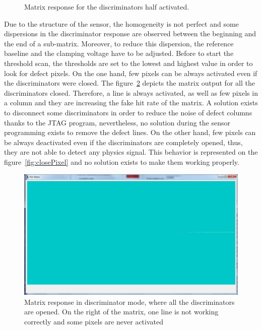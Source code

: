   \begin{figure}[!h]
    \caption{Matrix response for the discriminators half activated.}
    \label{fig:homogeneityMi26}
  \end{figure}
  
  Due to the structure of the sensor, the homogeneity is not perfect and some dispersions in the discriminator response are observed between the beginning and the end of a sub-matrix.
  Moreover, to reduce this dispersion, the reference baseline and the clamping voltage have to be adjusted.
  Before to start the threshold scan, the thresholds are set to the lowest and highest value in order to look for defect pixels.
  On the one hand, few pixels can be always activated even if the discriminators were closed.
  The figure~\ref{fig:openPixel} depicts the matrix output for all the discriminators closed.
  Therefore, a line is always activated, as well as few pixels in a column and they are increasing the fake hit rate of the matrix.
  A solution exists to disconnect some discriminators in order to reduce the noise of defect columns thanks to the JTAG program, nevertheless, no solution during the sensor programming exists to remove the defect lines.
  On the other hand, few pixels can be always deactivated even if the discriminators are completely opened, thus, they are not able to detect any physics signal.
  This behavior is represented on the figure~\ref{fig:closePixel} and no solution exists to make them working properly.
   
  \begin{figure}[!h]
    \centering
    \includegraphics[width=\textwidth]{Pictures/labTests/th0.png}
    \caption{Matrix response in discriminator mode, where all the discriminators are opened. On the right of the matrix, one line is not working correctly and some pixels are never activated}
    \label{fig:openPixel}
  \end{figure}
   
